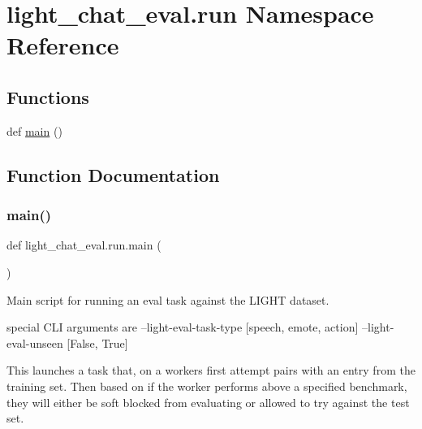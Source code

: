 \hypertarget{namespacelight__chat__eval_1_1run}{}\section{light\+\_\+chat\+\_\+eval.\+run Namespace Reference}
\label{namespacelight__chat__eval_1_1run}
\subsection*{Functions}
\begin{DoxyCompactItemize}
\item 
def \hyperlink{namespacelight__chat__eval_1_1run_a6f95134244efdc98f98e673ae68c8037}{main} ()
\end{DoxyCompactItemize}


\subsection{Function Documentation}
\mbox{\label{namespacelight__chat__eval_1_1run_a6f95134244efdc98f98e673ae68c8037}} 
\subsubsection{\texorpdfstring{main()}{main()}}
{\footnotesize\ttfamily def light\+\_\+chat\+\_\+eval.\+run.\+main (\begin{DoxyParamCaption}{ }\end{DoxyParamCaption})}

\begin{DoxyVerb}Main script for running an eval task against the LIGHT dataset.

special CLI arguments are
  --light-eval-task-type [speech, emote, action]
  --light-eval-unseen [False, True]

This launches a task that, on a workers first attempt pairs with an entry
from the training set. Then based on if the worker performs above a
specified benchmark, they will either be soft blocked from evaluating or
allowed to try against the test set.
\end{DoxyVerb}
 